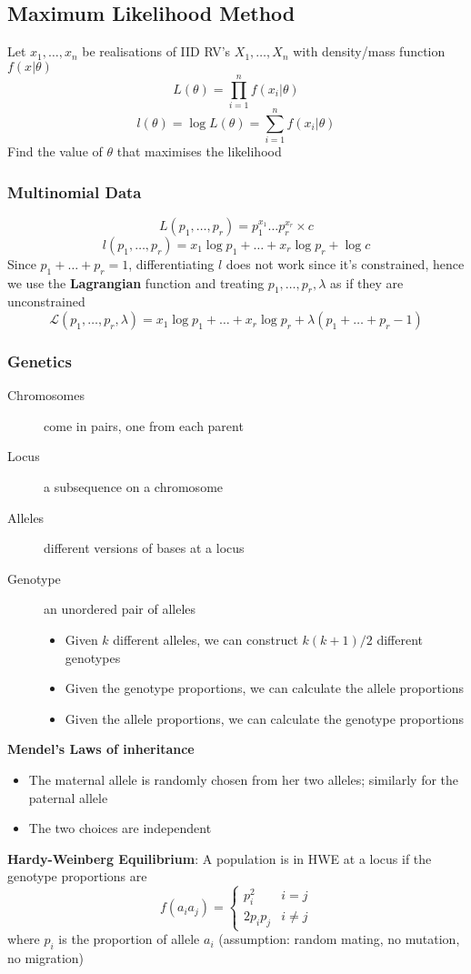 \documentclass{article}
\begin{document}
\begin{multicols}{2}
\subsection{Maximum Likelihood Method}
Let $x_1, \dots, x_n$ be realisations of IID RV's $X_1, \dots, X_n$ with density/mass function $f(x|\theta)$
$$L(\theta) = \prod_{i=1}^{n}f(x_i|\theta)$$
$$l(\theta) = \log{L(\theta)} = \sum_{i=1}^{n}f(x_i|\theta)$$
Find the value of $\theta$ that maximises the likelihood
\subsubsection{Multinomial Data}
$$L(p_1,\dots,p_r) = p_1^{x_1}\dots p_r^{x_r} \times c$$
$$l(p_1,\dots,p_r) = x_1 \log p_1 + \dots + x_r \log p_r + \log c$$
Since $p_1 + \dots + p_r = 1$, differentiating $l$ does not work since it's constrained, hence we use the \textbf{Lagrangian} function and treating $p_1, \dots, p_r, \lambda$ as if they are unconstrained
$$\mathcal{L}(p_1, \dots, p_r, \lambda) = x_1 \log p_1 + \dots + x_r \log p_r + \lambda(p_1 + \dots + p_r-  1)$$
\subsubsection{Genetics}
\begin{description}
	\item[Chromosomes] come in pairs, one from each parent
	\item[Locus] a subsequence on a chromosome
	\item[Alleles] different versions of bases at a locus
	\item[Genotype] an unordered pair of alleles
	\begin{itemize}
		\item Given $k$ different alleles, we can construct $k(k+1)/2$ different genotypes
		\item Given the genotype proportions, we can calculate the allele proportions
		\item Given the allele proportions, we can calculate the genotype proportions
	\end{itemize}
\end{description}
\textbf{Mendel's Laws of inheritance}
\begin{itemize}
	\item The maternal allele is randomly chosen from her two alleles; similarly for the paternal allele
	\item The two choices are independent
\end{itemize}
\textbf{Hardy-Weinberg Equilibrium}: A population is in HWE at a locus if the genotype proportions are
$$
f(a_ia_j) =
\left\{\begin{matrix}
p_i^2 & i = j\\
2p_ip_j & i\neq j
\end{matrix}\right.
$$
where $p_i$ is the proportion of allele $a_i$ (assumption: random mating, no mutation, no migration)


\end{multicols}
\end{document}

